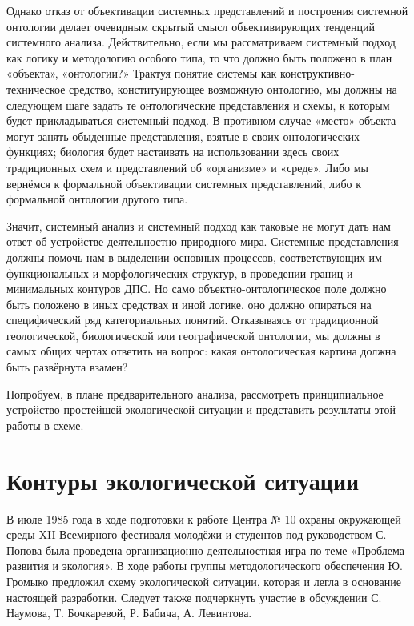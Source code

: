 \documentclass[11pt,a4paper]{article}
\begin{document}
Однако отказ от объективации системных представлений и построения системной
онтологии делает очевидным скрытый смысл объективирующих тенденций системного
анализа. Действительно, если мы рассматриваем системный подход как логику и
методологию особого типа, то что должно быть положено в план «объекта»,
«онтологии?» Трактуя понятие системы как конструктивно-техническое средство,
конституирующее возможную онтологию, мы должны на следующем шаге задать те
онтологические представления и схемы, к которым будет прикладываться системный
подход. В противном случае «место» объекта могут занять обыденные
представления, взятые в своих онтологических функциях; биология будет
настаивать на использовании здесь своих традиционных схем и представлений об
«организме» и «среде». Либо мы вернёмся к формальной объективации системных
представлений, либо к формальной онтологии другого типа. 

Значит, системный анализ и системный подход как таковые не могут дать нам
ответ об устройстве деятельностно-природного мира. Системные представления
должны помочь нам в выделении основных процессов, соответствующих им
функциональных и морфологических структур, в проведении границ и минимальных
контуров ДПС. Но само объектно-онтологическое поле должно быть положено в иных
средствах и иной логике, оно должно опираться на специфический ряд
категориальных понятий. Отказываясь от традиционной геологической,
биологической или географической онтологии, мы должны в самых общих чертах
ответить на вопрос: какая онтологическая картина должна быть развёрнута
взамен? 

Попробуем, в плане предварительного анализа, рассмотреть принципиальное
устройство простейшей экологической ситуации и представить результаты этой
работы в схеме. 

\section{Контуры экологической ситуации}

В июле 1985 года в ходе подготовки к работе Центра № 10 охраны окружающей
среды XII Всемирного фестиваля молодёжи и студентов под руководством С. Попова
была проведена организационно-деятельностная игра по теме «Проблема развития и
экология». В ходе работы группы методологического обеспечения Ю. Громыко
предложил схему экологической ситуации, которая и легла в основание настоящей
разработки. Следует также подчеркнуть участие в обсуждении С. Наумова,
Т. Бочкаревой, Р. Бабича, А. Левинтова.
\end{document}
